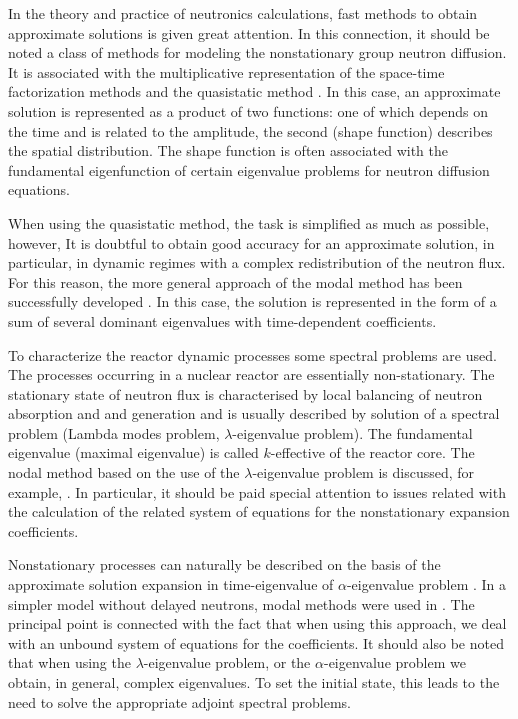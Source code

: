 \documentclass[authoryear]{elsarticle}
\begin{document}
In the theory and practice of neutronics calculations, fast methods to obtain approximate solutions is given great attention. In this connection, it should be noted a class of methods for modeling the nonstationary group neutron diffusion. It is associated with the multiplicative representation of the space-time factorization methods and the quasistatic method  \citep{dodds1976accuracy,chou1990three,goluoglu2001time,dulla2008quasi,dahmani20013d}.
In this case, an approximate solution is represented as a product of two functions: one of which depends on the time and is related to the amplitude, the second (shape function) describes the spatial distribution. The shape function is often associated with the fundamental eigenfunction of certain eigenvalue problems for neutron diffusion equations. 

When using the quasistatic method, the task is simplified as much as possible, however, It is doubtful to obtain good accuracy for an approximate solution, in particular, in dynamic regimes with a complex redistribution of the neutron flux. For this reason, the more general approach of the modal method has been successfully developed  \citep{stacey1967modal,stacey1969space,sutton1996diffusion}.
In this case, the solution is represented in the form of a sum of several dominant eigenvalues with time-dependent coefficients.

To characterize the reactor dynamic processes some spectral problems  \citep{Bell1970,hetrick1971dynamics,stewart1976spectral,stacey} are used. The processes occurring in a nuclear reactor are essentially non-stationary. 
The stationary state of neutron flux is characterised by local balancing of neutron absorption and and generation
and is usually described by solution of a spectral problem (Lambda modes problem, $\lambda$-eigenvalue problem).
The fundamental eigenvalue (maximal eigenvalue) is called $k$-effective of the reactor core.
The nodal method based on the use of the  $\lambda$-eigenvalue problem is discussed, for example,  \cite{verdu1998modal,miro2002nodal,gonzalez2009high}. In particular, it should be paid special attention to issues related with the calculation of the related system of equations for the nonstationary expansion coefficients. 

Nonstationary processes can naturally be described on the basis of the approximate solution expansion in time-eigenvalue of  $\alpha$-eigenvalue problem \citep{ginestar2002transient,verdu20103d,verdu2014modal}.
In a simpler model without delayed neutrons, modal methods were used in  \cite{modak2007scheme}.
The principal point is connected with the fact that when using this approach, we deal with an unbound system of equations for the coefficients. It should also be noted that when using the   $\lambda$-eigenvalue problem, or the 
$\alpha$-eigenvalue problem we obtain, in general, complex eigenvalues. To set the initial state, this leads to the need to solve the appropriate adjoint spectral problems.
\end{document}
